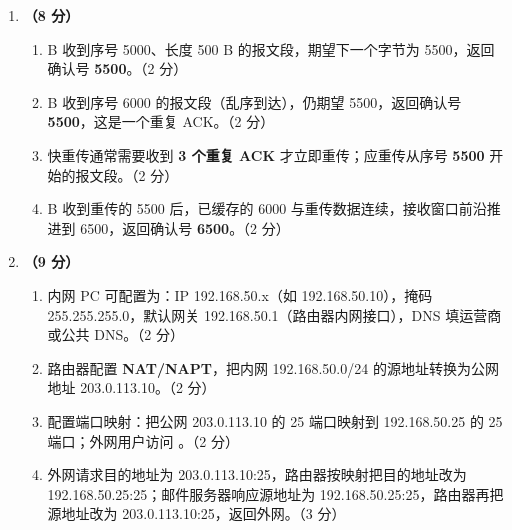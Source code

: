 \documentclass[a4paper,11pt]{article}
\begin{document}
\begin{enumerate}[start=13, label=\textbf{\arabic*.}, leftmargin=2.4em, itemsep=0.45em]
\item \textbf{（8 分）}
\begin{enumerate}[label=（\arabic*）, leftmargin=2.2em, itemsep=1pt]
  \item B 收到序号 5000、长度 500 B 的报文段，期望下一个字节为 5500，返回确认号 \textbf{5500}。\hfill（2 分）
  \item B 收到序号 6000 的报文段（乱序到达），仍期望 5500，返回确认号 \textbf{5500}，这是一个重复 ACK。\hfill（2 分）
  \item 快重传通常需要收到 \textbf{3 个重复 ACK} 才立即重传；应重传从序号 \textbf{5500} 开始的报文段。\hfill（2 分）
  \item B 收到重传的 5500 后，已缓存的 6000 与重传数据连续，接收窗口前沿推进到 6500，返回确认号 \textbf{6500}。\hfill（2 分）
\end{enumerate}

\item \textbf{（9 分）}
\begin{enumerate}[label=（\arabic*）, leftmargin=2.2em, itemsep=1pt]
  \item 内网 PC 可配置为：IP 192.168.50.x（如 192.168.50.10），掩码 255.255.255.0，默认网关 192.168.50.1（路由器内网接口），DNS 填运营商或公共 DNS。\hfill（2 分）
  \item 路由器配置 \textbf{NAT/NAPT}，把内网 192.168.50.0/24 的源地址转换为公网地址 203.0.113.10。\hfill（2 分）
  \item 配置端口映射：把公网 203.0.113.10 的 25 端口映射到 192.168.50.25 的 25 端口；外网用户访问 。\hfill（2 分）
  \item 外网请求目的地址为 203.0.113.10:25，路由器按映射把目的地址改为 192.168.50.25:25；邮件服务器响应源地址为 192.168.50.25:25，路由器再把源地址改为 203.0.113.10:25，返回外网。\hfill（3 分）
\end{enumerate}

\end{enumerate}

\end{document}
